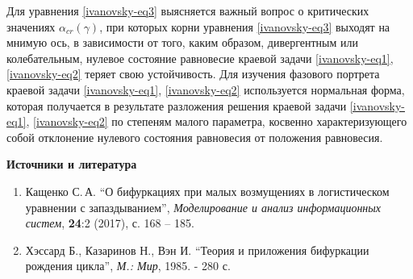 \documentclass[a4paper, 12pt, oneside]{ncc}
\begin{document}
Для уравнения \eqref{ivanovsky-eq3} выясняется важный вопрос о критических значениях $\alpha_{cr}(\gamma)$, при которых корни уравнения \eqref{ivanovsky-eq3} выходят на мнимую ось, в зависимости от того, каким образом, дивергентным или колебательным, нулевое состояние равновесие краевой задачи \eqref{ivanovsky-eq1}, \eqref{ivanovsky-eq2} теряет свою устойчивость. Для изучения фазового портрета краевой задачи \eqref{ivanovsky-eq1}, \eqref{ivanovsky-eq2} используется нормальная форма, которая получается в результате разложения решения краевой задачи \eqref{ivanovsky-eq1}, \eqref{ivanovsky-eq2} по степеням малого параметра, косвенно характеризующего собой отклонение нулевого состояния равновесия от положения равновесия.

\begin{center}\textbf{Источники и литература}\end{center}
\begin{enumerate}
\item Кащенко С.\,А. ``О бифуркациях при малых возмущениях в логистическом уравнении с запаздыванием'', \textit{Моделирование и анализ информационных систем}, \textbf{24}:2 (2017), с. 168 – 185.{\sloppy

}
\item Хэссард Б., Казаринов Н., Вэн И. ``Теория и приложения бифуркации рождения цикла'', \textit{М.: Мир}, 1985. - 280 с.{\sloppy

}
\end{enumerate}
\\
\end{document}
